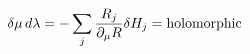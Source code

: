 \begin{equation}
\delta \mu \,d\lambda = - \sum_j {R_j\over  \partial_\mu R } \delta H_j = {\rm holomorphic}
\label{deltamu}
\end{equation}

